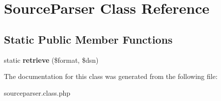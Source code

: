 \hypertarget{classSourceParser}{
\section{SourceParser Class Reference}
\label{classSourceParser}
}
\subsection*{Static Public Member Functions}
\begin{DoxyCompactItemize}
\item 
\hypertarget{classSourceParser_a9ca9020de453b4b094a71aa6ba369abd}{
static {\bfseries retrieve} (\$format, \$dsn)}
\label{classSourceParser_a9ca9020de453b4b094a71aa6ba369abd}

\end{DoxyCompactItemize}


The documentation for this class was generated from the following file:\begin{DoxyCompactItemize}
\item 
sourceparser.class.php\end{DoxyCompactItemize}
